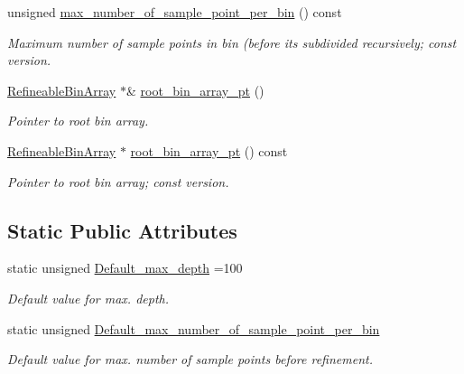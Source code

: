 \begin{DoxyCompactItemize}
unsigned \hyperlink{classoomph_1_1RefineableBinArrayParameters_a0a9b5ec5cb8b505a4166e9edacc2b964}{max\+\_\+number\+\_\+of\+\_\+sample\+\_\+point\+\_\+per\+\_\+bin} () const
\begin{DoxyCompactList}\small\item\em Maximum number of sample points in bin (before it\textquotesingle{}s subdivided recursively; const version. \end{DoxyCompactList}\item 
\hyperlink{classRefineableBinArray}{Refineable\+Bin\+Array} $\ast$\& \hyperlink{classoomph_1_1RefineableBinArrayParameters_a2e76aec48f38072750e1951f1373f5b9}{root\+\_\+bin\+\_\+array\+\_\+pt} ()
\begin{DoxyCompactList}\small\item\em Pointer to root bin array. \end{DoxyCompactList}\item 
\hyperlink{classRefineableBinArray}{Refineable\+Bin\+Array} $\ast$ \hyperlink{classoomph_1_1RefineableBinArrayParameters_a2405a7ef44b0b511a64e2410e53a4ca8}{root\+\_\+bin\+\_\+array\+\_\+pt} () const
\begin{DoxyCompactList}\small\item\em Pointer to root bin array; const version. \end{DoxyCompactList}\end{DoxyCompactItemize}
\subsection*{Static Public Attributes}
\begin{DoxyCompactItemize}
\item 
static unsigned \hyperlink{classoomph_1_1RefineableBinArrayParameters_a5de4867a1cd15e1e494cb53261f0b1a7}{Default\+\_\+max\+\_\+depth} =100
\begin{DoxyCompactList}\small\item\em Default value for max. depth. \end{DoxyCompactList}\item 
static unsigned \hyperlink{classoomph_1_1RefineableBinArrayParameters_a0e94143bc3bdbd74d8927ea7e9c5f234}{Default\+\_\+max\+\_\+number\+\_\+of\+\_\+sample\+\_\+point\+\_\+per\+\_\+bin}
\begin{DoxyCompactList}\small\item\em Default value for max. number of sample points before refinement. \end{DoxyCompactList}\end{DoxyCompactItemize}
